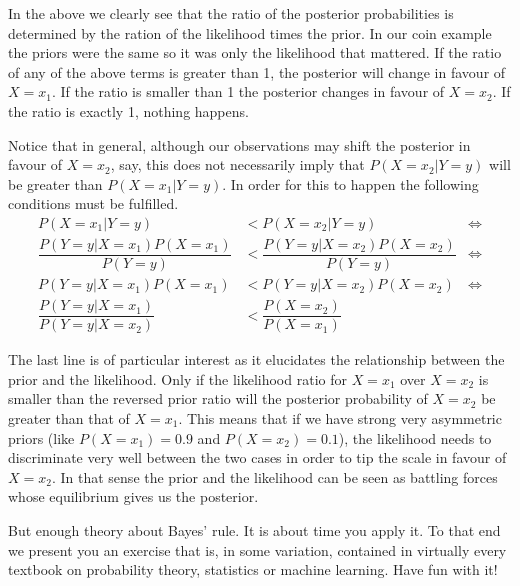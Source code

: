 In the above we clearly see that the ratio of the posterior probabilities is determined by the ration of the likelihood times the
prior. In our coin example the priors were the same so it was only the likelihood that mattered. If the ratio of any of the above
terms is greater than 1, the posterior will change in favour of $ X=x_{1} $. If the ratio is smaller than 1 the posterior changes
in favour of $ X=x_{2} $. If the ratio is exactly 1, nothing happens. 

Notice that in general, although our observations may shift the posterior in favour of $ X=x_{2} $, say, this does not necessarily imply that 
$ P(X=x_{2}|Y=y) $ will be greater than $ P(X=x_{1}|Y=y) $. In order for this to happen the following conditions
must be fulfilled.
\begin{align}
P(X=x_{1}|Y=y) &< P(X=x_{2}|Y=y)  &\Leftrightarrow \\
\dfrac{P(Y=y|X=x_{1})P(X=x_{1})}{P(Y=y)} &< \dfrac{P(Y=y|X=x_{2})P(X=x_{2})}{P(Y=y)} &\Leftrightarrow \\
P(Y=y|X=x_{1})P(X=x_{1}) &< P(Y=y|X=x_{2})P(X=x_{2}) &\Leftrightarrow \\
\dfrac{P(Y=y|X=x_{1})}{P(Y=y|X=x_{2})} &< \dfrac{P(X=x_{2})}{P(X=x_{1})}
\end{align} 

The last line is of particular interest as it elucidates the relationship between the prior and the likelihood. Only if the likelihood
ratio for $ X=x_{1} $ over $ X=x_{2} $ is smaller than the reversed prior ratio will the posterior probability of $ X=x_{2} $
be greater than that of $ X=x_{1} $. This means that if we have strong very asymmetric priors (like $ P(X=x_{1}) = 0.9 $
and $ P(X=x_{2}) = 0.1 $), the likelihood needs to discriminate very well between the two cases in order to tip the scale in
favour of $ X=x_{2} $. In that sense the prior and the likelihood can be seen as battling forces whose equilibrium gives us 
the posterior.

But enough theory about Bayes' rule. It is about time you apply it. To that end we present you an exercise that is, in some variation,
contained in virtually every textbook on probability theory, statistics or machine learning. Have fun with it!

